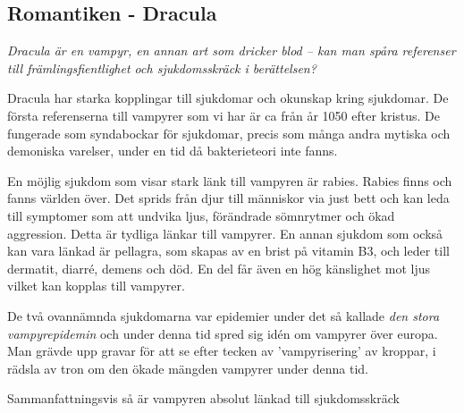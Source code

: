 \subsection{Romantiken - Dracula}

\textit{Dracula är en vampyr, en annan art som dricker blod – kan man spåra referenser till främlingsfientlighet och sjukdomsskräck i berättelsen?} \bigskip

Dracula har starka kopplingar till sjukdomar och okunskap kring sjukdomar. De första referenserna till vampyrer som vi har är ca från år 1050 efter kristus. De fungerade som syndabockar för sjukdomar, precis som många andra mytiska och demoniska varelser, under en tid då bakterieteori inte fanns.

En möjlig sjukdom som visar stark länk till vampyren är rabies. Rabies finns och fanns världen över. Det sprids från djur till människor via just bett och kan leda till symptomer som att undvika ljus, förändrade sömnrytmer och ökad aggression. Detta är tydliga länkar till vampyrer. En annan sjukdom som också kan vara länkad är pellagra, som skapas av en brist på vitamin B3, och leder till dermatit, diarré, demens och död. En del får även en hög känslighet mot ljus vilket kan kopplas till vampyrer.

De två ovannämnda sjukdomarna var epidemier under det så kallade \textit{den stora vampyrepidemin} och under denna tid spred sig idén om vampyrer över europa. Man grävde upp gravar för att se efter tecken av 'vampyrisering' av kroppar, i rädsla av tron om den ökade mängden vampyrer under denna tid.



Sammanfattningsvis så är vampyren absolut länkad till sjukdomsskräck

























